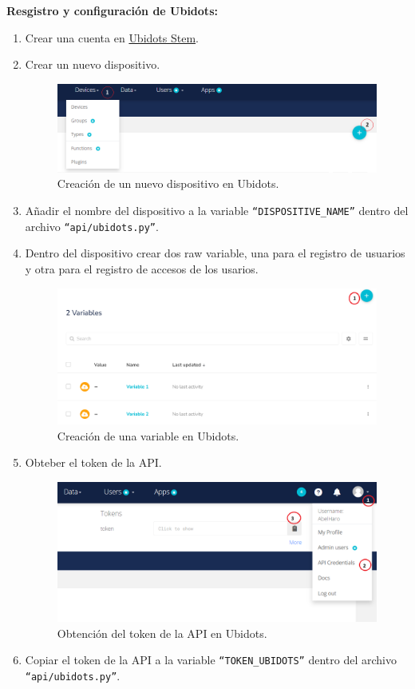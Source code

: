 \documentclass{article}
\begin{document}
\textbf{Resgistro y configuración de Ubidots:}
\begin{enumerate}
	\item Crear una cuenta en \href{https://stem.ubidots.com/}{Ubidots Stem}.
	\item Crear un nuevo dispositivo.
	\begin{figure}[H]
		\centering
		\includegraphics[width=0.7\linewidth]{../images/ubidots_create_device_1.png}
		\caption{\label{fig:ubidots_create_device_1}Creación de un nuevo dispositivo en Ubidots.}
	\end{figure}
	\item Añadir el nombre del dispositivo a la variable  \texttt{``DISPOSITIVE\_NAME''} dentro del archivo \texttt{``api/ubidots.py''}.
	\item Dentro del dispositivo crear dos raw variable, una para el registro de usuarios y otra para el registro de accesos de los usarios.
	\begin{figure}[H]
		\centering
		\includegraphics[width=0.7\linewidth]{../images/ubidots_create_variable.png}
		\caption{\label{fig:ubidots_create_variable_1}Creación de una variable en Ubidots.}
	\end{figure}
	\item Obteber el token de la API.
		\begin{figure}[H]
			\centering
			\includegraphics[width=0.7\linewidth]{../images/ubidots_obtener_token.png}
			\caption{\label{fig:ubidots_obtener_token}Obtención del token de la API en Ubidots.}
		\end{figure}
	\item Copiar el token de la API a la variable \texttt{``TOKEN\_UBIDOTS''} dentro del archivo \texttt{``api/ubidots.py''}.
\end{enumerate}
\end{document}
